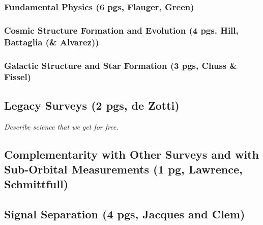 \documentclass[12pt]{article}
\begin{document}
\subsubsection{Fundamental Physics (6 pgs, Flauger, Green)}

\vspace{-0.05in}



\vspace{-0.05in}


\subsubsection{Cosmic Structure Formation and Evolution (4 pgs. Hill, Battaglia (\& Alvarez))}




\subsubsection{Galactic Structure and Star Formation (3 pgs, Chuss \& Fissel)}




\subsection{Legacy Surveys (2 pgs, de Zotti)} 

{\it Describe science that we get for free. }




\subsection{Complementarity with Other Surveys and with Sub-Orbital Measurements (1 pg, Lawrence, Schmittfull)} 




\subsection{Signal Separation (4 pgs, Jacques and Clem)}


\end{document}
